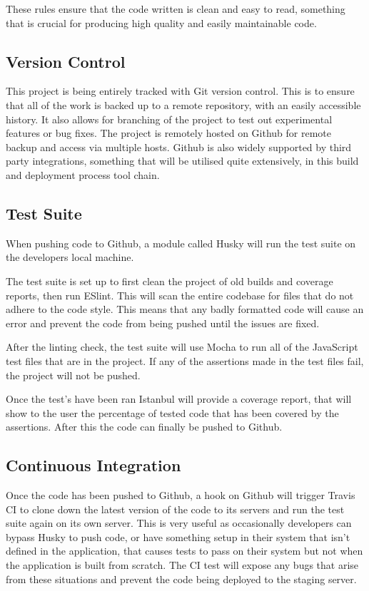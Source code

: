   These rules ensure that the code written is clean and easy to read, something that is crucial for producing high quality and easily maintainable code. 

  \subsection{Version Control}
    This project is being entirely tracked with Git version control. This is to ensure that all of the work is backed up to a remote repository, with an easily accessible history. It also allows for branching of the project to test out experimental features or bug fixes. The project is remotely hosted on Github\cite{github} for remote backup and access via multiple hosts. Github is also widely supported by third party integrations, something that will be utilised quite extensively, in this build and deployment process tool chain.


  \subsection{Test Suite}
  When pushing code to Github, a module called Husky\cite{husky} will run the test suite on the developers local machine.

    The test suite is set up to first clean the project of old builds and coverage reports, then run ESlint\cite{eslint}. This will scan the entire codebase for files that do not adhere to the code style. This means that any badly formatted code will cause an error and prevent the code from being pushed until the issues are fixed.

    After the linting check, the test suite will use Mocha\cite{mocha} to run all of the JavaScript test files that are in the project. If any of the assertions made in the test files fail, the project will not be pushed. 

    Once the test's have been ran Istanbul\cite{istanbul} will provide a coverage report, that will show to the user the percentage of tested code that has been covered by the assertions. After this the code can finally be pushed to Github. 
    
  \subsection{Continuous Integration}
    Once the code has been pushed to Github, a hook on Github will trigger Travis CI\cite{travis} to clone down the latest version of the code to its servers and run the test suite again on its own server. This is very useful as occasionally developers can bypass Husky to push code, or have something setup in their system that isn't defined in the application, that causes tests to pass on their system but not when the application is built from scratch. The CI test will expose any bugs that arise from these situations and prevent the code being deployed to the staging server. 

